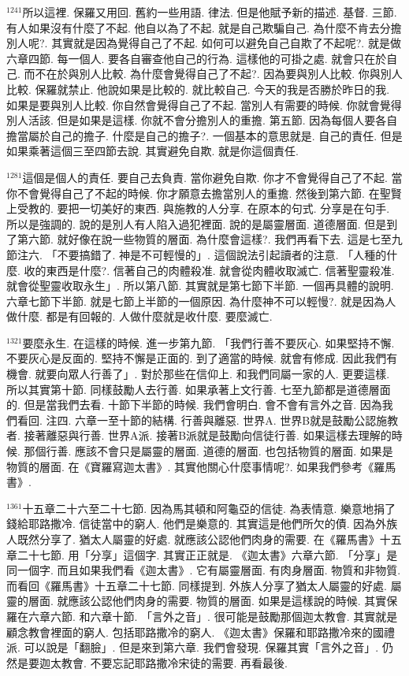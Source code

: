 \documentclass{book}
\begin{document}
$^{1241}$所以這裡.
保羅又用回.
舊約一些用語.
律法.
但是他賦予新的描述.
基督.
三節.
有人如果沒有什麼了不起.
他自以為了不起.
就是自己欺騙自己.
為什麼不肯去分擔別人呢?.
其實就是因為覺得自己了不起.
如何可以避免自己自欺了不起呢?.
就是做六章四節.
每一個人.
要各自審查他自己的行為.
這樣他的可掛之處.
就會只在於自己.
而不在於與別人比較.
為什麼會覺得自己了不起?.
因為要與別人比較.
你與別人比較.
保羅就禁止.
他說如果是比較的.
就比較自己.
今天的我是否勝於昨日的我.
如果是要與別人比較.
你自然會覺得自己了不起.
當別人有需要的時候.
你就會覺得別人活該.
但是如果是這樣.
你就不會分擔別人的重擔.
第五節.
因為每個人要各自擔當屬於自己的擔子.
什麼是自己的擔子?.
一個基本的意思就是.
自己的責任.
但是如果乘著這個三至四節去說.
其實避免自欺.
就是你這個責任.

$^{1281}$這個是個人的責任.
要自己去負責.
當你避免自欺.
你才不會覺得自己了不起.
當你不會覺得自己了不起的時候.
你才願意去擔當別人的重擔.
然後到第六節.
在聖賢上受教的.
要把一切美好的東西.
與施教的人分享.
在原本的句式.
分享是在句手.
所以是強調的.
說的是別人有人陷入過犯裡面.
說的是屬靈層面.
道德層面.
但是到了第六節.
就好像在說一些物質的層面.
為什麼會這樣?.
我們再看下去.
這是七至九節注六.
「不要搞錯了.
神是不可輕慢的」.
這個說法引起讀者的注意.
「人種的什麼.
收的東西是什麼?.
信著自己的肉體殺准.
就會從肉體收取滅亡.
信著聖靈殺准.
就會從聖靈收取永生」.
所以第八節.
其實就是第七節下半節.
一個再具體的說明.
六章七節下半節.
就是七節上半節的一個原因.
為什麼神不可以輕慢?.
就是因為人做什麼.
都是有回報的.
人做什麼就是收什麼.
要麼滅亡.

$^{1321}$要麼永生.
在這樣的時候.
進一步第九節.
「我們行善不要灰心.
如果堅持不懈.
不要灰心是反面的.
堅持不懈是正面的.
到了適當的時候.
就會有修成.
因此我們有機會.
就要向眾人行善了」.
對於那些在信仰上.
和我們同屬一家的人.
更要這樣.
所以其實第十節.
同樣鼓勵人去行善.
如果承著上文行善.
七至九節都是道德層面的.
但是當我們去看.
十節下半節的時候.
我們會明白.
會不會有言外之音.
因為我們看回.
注四.
六章一至十節的結構.
行善與離惡.
世界A.
世界B就是鼓勵公認施教者.
接著離惡與行善.
世界A派.
接著B派就是鼓勵向信徒行善.
如果這樣去理解的時候.
那個行善.
應該不會只是屬靈的層面.
道德的層面.
也包括物質的層面.
如果是物質的層面.
在《寶羅寫迦太書》.
其實他關心什麼事情呢?.
如果我們參考《羅馬書》.

$^{1361}$十五章二十六至二十七節.
因為馬其頓和阿龜亞的信徒.
為表情意.
樂意地捐了錢給耶路撒冷.
信徒當中的窮人.
他們是樂意的.
其實這是他們所欠的債.
因為外族人既然分享了.
猶太人屬靈的好處.
就應該公認他們肉身的需要.
在《羅馬書》十五章二十七節.
用「分享」這個字.
其實正正就是.
《迦太書》六章六節.
「分享」是同一個字.
而且如果我們看《迦太書》.
它有屬靈層面.
有肉身層面.
物質和非物質.
而看回《羅馬書》十五章二十七節.
同樣提到.
外族人分享了猶太人屬靈的好處.
屬靈的層面.
就應該公認他們肉身的需要.
物質的層面.
如果是這樣說的時候.
其實保羅在六章六節.
和六章十節.
「言外之音」.
很可能是鼓勵那個迦太教會.
其實就是顧念教會裡面的窮人.
包括耶路撒冷的窮人.
《迦太書》保羅和耶路撒冷來的國禮派.
可以說是「翻臉」.
但是來到第六章.
我們會發現.
保羅其實「言外之音」.
仍然是要迦太教會.
不要忘記耶路撒冷宋徒的需要.
再看最後.
\end{document}
